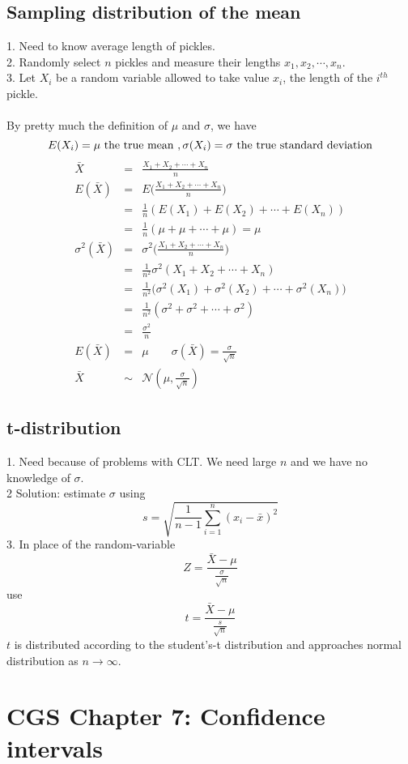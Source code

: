 \documentclass{article}
\newcommand{\beq}{\begin{equation}}
\newcommand{\eeq}{\end{equation}}
\newcommand{\ber}{\begin{eqnarray}}
\newcommand{\eer}{\end{eqnarray}}
\begin{document}
\subsection{Sampling distribution of the mean}
1. Need to know average length of pickles. \\
2. Randomly select $n$ pickles and measure their lengths $x_1,x_2,\cdots,x_n$.\\
3. Let $X_i$ be a random variable allowed to take value $x_i$, the length of the $i^{th}$ pickle.\\\\
By pretty much the definition of $\mu$ and $\sigma$, we have
\beq
E(X_i) = \mu \text{ the true mean }, \sigma(X_i) = \sigma \text{ the true standard deviation} \\
\eeq
\ber
\bar{X} &=& \frac{X_1+X_2+\cdots+X_n}{n}\\
E(\bar{X}) &=& E\Big(\frac{X_1+X_2+\cdots+X_n}{n}\Big)\\
  &=& \frac{1}{n}(E(X_1) + E(X_2) + \cdots + E(X_n))\\
&=& \frac{1}{n}(\mu+\mu+\cdots+\mu) = \mu\\
\sigma^2(\bar{X}) &=&  \sigma^2\Big(\frac{X_1+X_2+\cdots+X_n}{n}\Big)\\
&=& \frac{1}{n^2}\sigma^2(X_1+X_2+\cdots+X_n) \\
&=&  \frac{1}{n^2}\Big(\sigma^2(X_1)+\sigma^2(X_2)+\cdots+\sigma^2(X_n)\Big)\\
&=& \frac{1}{n^2}(\sigma^2+\sigma^2+\cdots+\sigma^2)\\
&=& \frac{\sigma^2}{n}\\
E(\bar{X}) &=& \mu \qquad \sigma(\bar{X}) = \frac{\sigma}{\sqrt{n}}\\
\bar{X} &\sim& \mathcal{N}(\mu,\frac{\sigma}{\sqrt{n}})
\eer
\subsection{t-distribution}
1. Need because of problems with CLT. We need large $n$ and we have no knowledge of $\sigma$.\\
2  Solution: estimate $\sigma$ using
\beq
s = \sqrt{\frac{1}{n-1}\sum_{i=1}^{n}(x_i-\bar{x})^2}
\eeq
3. In place of the random-variable
\beq
Z = \frac{\bar{X}-\mu}{\frac{\sigma}{\sqrt{n}}}
\eeq
use
\beq
t=\frac{\bar{X}-\mu}{\frac{s}{\sqrt{n}}}
\eeq
$t$ is distributed according to the student's-t distribution and approaches normal distribution as $n\rightarrow\infty$.
\section{CGS Chapter 7: Confidence intervals}
\end{document}
